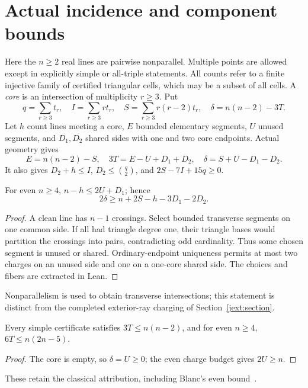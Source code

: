 \section{Actual incidence and component bounds}
\label{jup:section}

Here the $n\ge2$ real lines are pairwise nonparallel. Multiple points are allowed except in explicitly simple or all-triple statements. All counts refer to a finite injective family of certified triangular cells, which may be a subset of all cells. A \emph{core} is an intersection of multiplicity $r\ge3$. Put
\[
 q=\sum_{r\ge3}t_r,\quad I=\sum_{r\ge3}rt_r,\quad
 S=\sum_{r\ge3}r(r-2)t_r,\quad\delta=n(n-2)-3T.
\]
Let $h$ count lines meeting a core, $E$ bounded elementary segments, $U$ unused segments, and $D_1,D_2$ shared sides with one and two core endpoints. Actual geometry gives
\begin{equation}\label{jup:identity}
 E=n(n-2)-S,\quad3T=E-U+D_1+D_2,\quad
 \delta=S+U-D_1-D_2.
\end{equation}
It also gives $D_2+h\le I$, $D_2\le\binom q2$, and $2S-7I+15q\ge0$.

\begin{lemma}\label{jup:clean}
For even $n\ge4$, $n-h\le2U+D_1$; hence
\begin{equation}\label{jup:budget}
 2\delta\ge n+2S-h-3D_1-2D_2.
\end{equation}
\end{lemma}
\begin{proof}
A clean line has $n-1$ crossings. Select bounded transverse segments on one common side. If all had triangle degree one, their triangle bases would partition the crossings into pairs, contradicting odd cardinality. Thus some chosen segment is unused or shared. Ordinary-endpoint uniqueness permits at most two charges on an unused side and one on a one-core shared side. The choices and fibers are extracted in Lean.
\end{proof}
Nonparallelism is used to obtain transverse intersections; this statement is distinct from the completed exterior-ray charging of Section~\ref{jext:section}.

\begin{theorem}\label{jup:simple}
Every simple certificate satisfies $3T\le n(n-2)$, and for even $n\ge4$, $6T\le n(2n-5)$.
\end{theorem}
\begin{proof}
The core is empty, so $\delta=U\ge0$; the even charge budget gives $2U\ge n$.
\end{proof}
These retain the classical attribution, including Blanc's even bound~\cite{blanc2011}.

